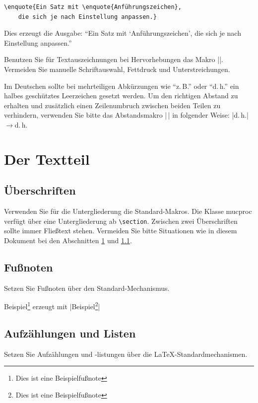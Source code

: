 \documentclass[ngerman,forcefinal
	]{mucproc}
\newenvironment{minted}[2][]{\endgraf\verbatim}{\endverbatim}
\begin{document}
\begin{verbatim}
\enquote{Ein Satz mit \enquote{Anführungszeichen},
	die sich je nach Einstellung anpassen.}
\end{verbatim}
Dies erzeugt die Ausgabe: \enquote{Ein Satz mit \enquote{Anführungszeichen}, die sich je nach Einstellung anpassen.}

Benutzen Sie für Textauszeichnungen bei Hervorhebungen das Makro |\emph{}|. Vermeiden Sie manuelle Schriftauswahl, Fettdruck und Unterstreichungen.

Im Deutschen sollte bei mehrteiligen Abkürzungen wie \enquote{z.\,B.} oder \enquote{d.\,h.} ein halbes geschütztes Leerzeichen gesetzt werden.
Um den richtigen Abstand zu erhalten und zusätzlich einen Zeilenumbruch zwischen beiden Teilen zu verhindern, verwenden Sie bitte das Abstandsmakro |\,| in folgender Weise: |d.\,h.|${}\to{}$d.\,h.

\section{Der Textteil}\label{sec:text}
\subsection{Überschriften}\label{sec:sectioning}
Verwenden Sie für die Untergliederung die Standard-Makros. Die Klasse \textsf{mucproc} verfügt über eine Untergliederung ab \texttt{\textbackslash{}section}. Zwischen zwei Überschriften sollte immer Fließtext stehen. Vermeiden Sie bitte Situationen wie in diesem Dokument bei den Abschnitten \ref{sec:text} und \ref{sec:sectioning}.
 


\subsection{Fußnoten}
Setzen Sie Fußnoten über den Standard-Mechanismus.

Beispiel\footnote{Dies ist eine Beispielfußnote} erzeugt mit |Beispiel\footnote{Dies ist eine Beispielfußnote}|

\subsection{Aufzählungen und Listen}
Setzen Sie Aufzählungen und -listungen über die \LaTeX-Standardmechanismen.
\end{document}
